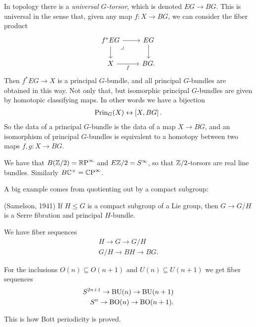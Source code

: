 \documentclass[11pt,openany]{book}
\begin{document}
In topology there is a \textit{universal $G$-torsor}, which is denoted $EG \to BG$. This is universal in the sense that, given any map $f \colon X \to BG$, we can consider the fiber product
\[ \begin{tikzcd}
    f^\ast EG\rar\dar\pb & EG\dar\\
    X\rar["f" below] & BG.
\end{tikzcd} \]
Then $f^\ast EG \to X$ is a principal $G$-bundle, and all principal $G$-bundles are obtained in this way. Not only that, but isomorphic principal $G$-bundles are given by homotopic classifying maps. In other words we have a bijection
\begin{align*}
    \mathrm{Prin}_G(X) \leftrightarrow \left[ X,BG \right].
\end{align*}
%
So the data of a principal $G$-bundle is the data of a map $X \to BG$, and an isomorphism of principal $G$-bundles is equivalent to a homotopy between two maps $f,g \colon X \to BG$.

\begin{example} We have that $B(\mathbb{Z}/2) ={\mathbb{R}\text{P}}^\infty$ and $E\mathbb{Z}/2 = S^\infty$, so that $\mathbb{Z}/2$-torsors are real line bundles. Similarly $B\mathbb{C}^\times = {\mathbb{C}\text{P}}^\infty$.
\end{example}

A big example comes from quotienting out by a compact subgroup:

\begin{theorem} (Samelson, 1941) If $H \le G$ is a compact subgroup of a Lie group, then $G \to G/H$ is a Serre fibration and principal $H$-bundle.
\end{theorem}

\begin{corollary} We have fiber sequences
\begin{align*}
    H \to G \to G/H \\
    G/H \to BH \to BG.
\end{align*}
\end{corollary}

\begin{example} For the inclusions $O(n) \subseteq O(n+1)$ and $U(n) \subseteq U(n+1)$ we get fiber sequences
\begin{align*}
    S^{2n+1} \to \mathrm{BU}(n) \to \mathrm{BU}(n+1) \\
    S^n \to \mathrm{BO}(n) \to \mathrm{BO}(n+1).
\end{align*}
\end{example}
This is how Bott periodicity is proved.
\end{document}
